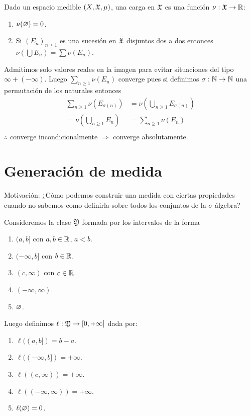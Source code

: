 \begin{definition}[Carga]
    Dado un espacio medible $(X, \mathfrak{X}, \mu)$, una carga en $\mathfrak{X}$ es una función $\nu : \mathfrak{X} \to \mathbb{R}$: \begin{enumerate}
        \item $\nu(\varnothing) = 0$.
        \item Si $(E_n)_{n \geq 1}$ es una sucesión en $\mathfrak{X}$ disjuntos dos a dos entonces $\nu(\bigcup E_n) = \sum \nu(E_n)$.
    \end{enumerate}

    Admitimos solo valores reales en la imagen para evitar situaciones del tipo $\infty + (-\infty)$.
    Luego $\sum_{n \geq 1} \nu(E_n)$ converge pues si definimos $\sigma : \mathbb{N} \to \mathbb{N}$ una permutación de los naturales entonces
    \begin{align*}
        \sum_{n \geq 1} \nu(E_{\sigma(n)}) & = \nu (\bigcup_{n \geq 1} E_{\sigma(n)}) \\
        = \nu (\bigcup_{n \geq 1} E_n)     & = \sum_{n \geq 1} \nu(E_{n})             \\
    \end{align*}
    $\therefore$ converge incondicionalmente $\Rightarrow$ converge absolutamente.
\end{definition}

\section{Generación de medida}

Motivación: ¿Cómo podemos construir una medida con ciertas propiedades
cuando no sabemos como definirla sobre todos los conjuntos de la $\sigma$-álgebra?

Consideremos la clase $\mathfrak{Y}$ formada por los intervalos de la forma \begin{enumerate}
    \item $(a, b]$ con $a, b \in \mathbb{R}$, $a<b$.
    \item $(-\infty, b]$ con $b \in \mathbb{R}$.
    \item $(c, \infty)$ con $c \in \mathbb{R}$.
    \item $(-\infty, \infty)$.
    \item $\varnothing$.
\end{enumerate}

Luego definimos $\ell: \mathfrak{Y} \to [0, +\infty]$ dada por: \begin{enumerate}
    \item $\ell((a, b]) = b - a$.
    \item $\ell((-\infty, b]) = +\infty$.
    \item $\ell((c, \infty)) = +\infty$.
    \item $\ell((-\infty, \infty)) = +\infty$.
    \item $\ell(\varnothing) = 0$.
\end{enumerate}

